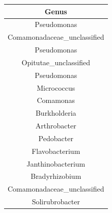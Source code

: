 \documentclass[]{article}
\begin{document}
\begin{longtable}[]{@{}c@{}}
\toprule
\begin{minipage}[b]{0.39\columnwidth}\centering\strut
Genus\strut
\end{minipage}\tabularnewline
\midrule
\endhead
\begin{minipage}[t]{0.39\columnwidth}\centering\strut
Pseudomonas\strut
\end{minipage}\tabularnewline
\begin{minipage}[t]{0.39\columnwidth}\centering\strut
Comamonadaceae\_unclassified\strut
\end{minipage}\tabularnewline
\begin{minipage}[t]{0.39\columnwidth}\centering\strut
Pseudomonas\strut
\end{minipage}\tabularnewline
\begin{minipage}[t]{0.39\columnwidth}\centering\strut
Opitutae\_unclassified\strut
\end{minipage}\tabularnewline
\begin{minipage}[t]{0.39\columnwidth}\centering\strut
Pseudomonas\strut
\end{minipage}\tabularnewline
\begin{minipage}[t]{0.39\columnwidth}\centering\strut
Micrococcus\strut
\end{minipage}\tabularnewline
\begin{minipage}[t]{0.39\columnwidth}\centering\strut
Comamonas\strut
\end{minipage}\tabularnewline
\begin{minipage}[t]{0.39\columnwidth}\centering\strut
Burkholderia\strut
\end{minipage}\tabularnewline
\begin{minipage}[t]{0.39\columnwidth}\centering\strut
Arthrobacter\strut
\end{minipage}\tabularnewline
\begin{minipage}[t]{0.39\columnwidth}\centering\strut
Pedobacter\strut
\end{minipage}\tabularnewline
\begin{minipage}[t]{0.39\columnwidth}\centering\strut
Flavobacterium\strut
\end{minipage}\tabularnewline
\begin{minipage}[t]{0.39\columnwidth}\centering\strut
Janthinobacterium\strut
\end{minipage}\tabularnewline
\begin{minipage}[t]{0.39\columnwidth}\centering\strut
Bradyrhizobium\strut
\end{minipage}\tabularnewline
\begin{minipage}[t]{0.39\columnwidth}\centering\strut
Comamonadaceae\_unclassified\strut
\end{minipage}\tabularnewline
\begin{minipage}[t]{0.39\columnwidth}\centering\strut
Solirubrobacter\strut
\end{minipage}\tabularnewline
\bottomrule
\end{longtable}
\end{document}
